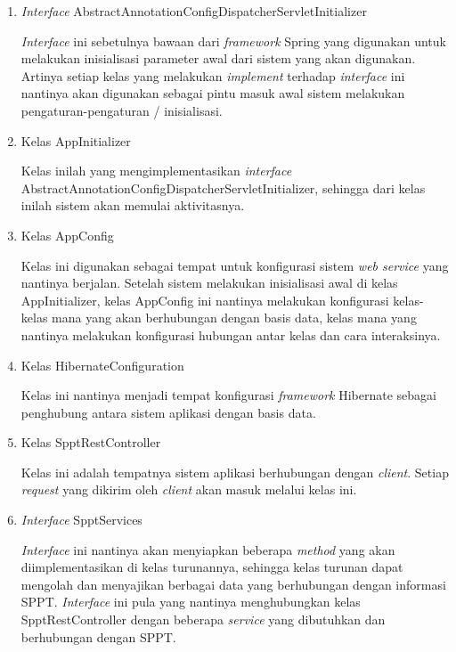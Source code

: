 \documentclass[pdftex,12pt, oneside]{article}
\begin{document}
\begin{enumerate}[1.]
  \item \textit{Interface} AbstractAnnotationConfigDispatcherServletInitializer
  
  \textit{Interface} ini sebetulnya bawaan dari \textit{framework} Spring yang digunakan untuk melakukan inisialisasi parameter awal dari sistem yang akan digunakan. Artinya setiap kelas yang melakukan \textit{implement} terhadap \textit{interface} ini nantinya akan digunakan sebagai pintu masuk awal sistem melakukan pengaturan-pengaturan / inisialisasi.
  
  \item Kelas AppInitializer
  
  Kelas inilah yang mengimplementasikan \textit{interface} AbstractAnnotationConfigDispatcherServletInitializer, sehingga dari kelas inilah sistem akan memulai aktivitasnya.
  
  \item Kelas AppConfig
  
  Kelas ini digunakan sebagai tempat untuk konfigurasi sistem \textit{web service} yang nantinya berjalan. Setelah sistem melakukan inisialisasi awal di kelas AppInitializer, kelas AppConfig ini nantinya melakukan konfigurasi kelas-kelas mana yang akan berhubungan dengan basis data, kelas mana yang nantinya melakukan konfigurasi hubungan antar kelas dan cara interaksinya.
  
  \item Kelas HibernateConfiguration
  
  Kelas ini nantinya menjadi tempat konfigurasi \textit{framework} Hibernate sebagai penghubung antara sistem aplikasi dengan basis data.
  
  \item Kelas SpptRestController
  
  Kelas ini adalah tempatnya sistem aplikasi berhubungan dengan \textit{client}. Setiap \textit{request} yang dikirim oleh \textit{client} akan masuk melalui kelas ini.
  
  \item \textit{Interface} SpptServices
  
  \textit{Interface} ini nantinya akan menyiapkan beberapa \textit{method} yang akan diimplementasikan di kelas turunannya, sehingga kelas turunan dapat mengolah dan menyajikan berbagai data yang berhubungan dengan informasi SPPT. \textit{Interface} ini pula yang nantinya menghubungkan kelas SpptRestController dengan beberapa \textit{service} yang dibutuhkan dan berhubungan dengan SPPT.
  

\end{enumerate}
\end{document}
